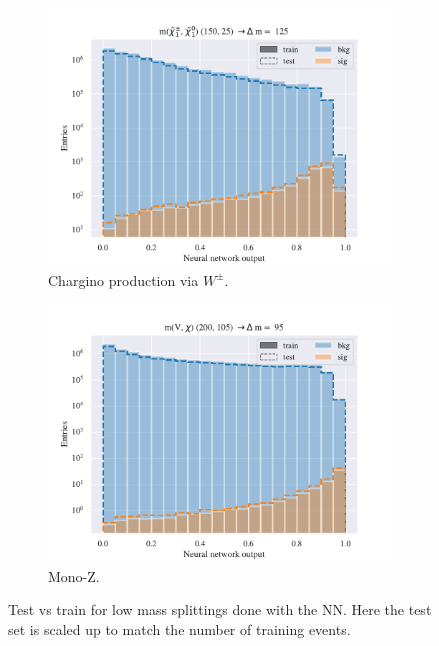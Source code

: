 \begin{figure}[H]
    \begin{subfigure}[t!]{0.49\textwidth}
        \includegraphics[width = \textwidth]{Figures/WW/NN/High_level/Low/scaled_train_test_395268.pdf}
        \caption{Chargino production via $W^\pm$.}
        \label{fig:WWNNLow}
    \end{subfigure}
    \begin{subfigure}[t!]{0.49\textwidth}
        \includegraphics[width = \textwidth]{Figures/Mono_Z/ML/NN/High_level/Low/scaled_train_test_310604.pdf}
        \caption{Mono-Z.}
        \label{fig:MonoZNNLow}
    \end{subfigure}
    \caption{Test vs train for low mass splittings done with the NN. Here the test set is scaled up to match the number of training events.}
    \label{fig:AllLowNN}
\end{figure}


